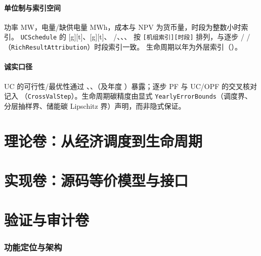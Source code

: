 \documentclass[UTF8,fontset=fandol,a4paper,11pt]{ctexart}
\begin{document}
\subsection{单位制与索引空间}
功率 MW，电量/缺供电量 MWh，成本与 NPV 为货币量，时段为整数小时索引。
\texttt{UCSchedule} 的 [g][t]、[g][t]、
/、、、
 按 \texttt{[机组索引][时段]} 排列，与逐步 /
/（\texttt{RichResultAttribution}）时段索引一致。
生命周期以年为外层索引（）。

\subsection{诚实口径}
UC 的可行性/最优性通过 、、（及年度
）暴露；逐步 PF 与 UC/OPF 的交叉核对记入 
（\texttt{CrossValStep}）。生命周期碳精度由显式 \texttt{YearlyErrorBounds}（调度界、
分层抽样界、储能碳 Lipschitz 界）声明，而非隐式保证。

\part{理论卷：从经济调度到生命周期}




\part{实现卷：源码等价模型与接口}








\part{验证与审计卷}



\section{功能定位与架构}
\end{document}
